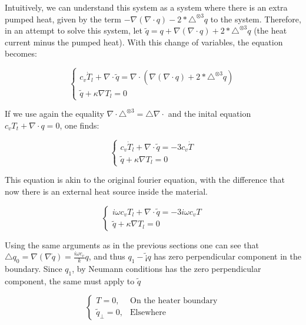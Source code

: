 \documentclass[a4paper, 11pt]{article}
\begin{document}
Intuitively, we can understand this system as a system where there is an extra pumped heat, given by the term $-\nabla(\nabla \cdot q) - 2*\triangle^{\otimes 3} q$ to the system. Therefore, in an attempt to solve this system, let $\tilde q =q + \nabla(\nabla \cdot q) + 2*\triangle^{\otimes 3} q$ (the heat current minus the pumped heat). With this change of variables, the equation becomes:


\begin{equation}
	\label{eq:hydrodinamic_pde_derivative_tilde}
	\begin{cases}
		{c_v \dot T_l + \nabla \cdot \tilde q = \nabla \cdot(\nabla(\nabla \cdot q) + 2*\triangle^{\otimes 3} q) } \\
		{\tilde q +\kappa \nabla T_l  = 0}
	\end{cases}
\end{equation}

If we use again the equality $\nabla \cdot \triangle^{\otimes 3} = \triangle \nabla \cdot {}$ and the inital equation ${c_v T_t + \nabla \cdot q =0}$, one finds:

\begin{equation}
	\label{eq:hydrodinamic_pde_derivative_tilde_2}
	\begin{cases}
		{c_v \dot T_l + \nabla \cdot \tilde q = -3 c_v \dot T} \\
		{\tilde q +\kappa \nabla T_l  = 0}
	\end{cases}
\end{equation}

This equation is akin to the original fourier equation, with the difference that now there is an external heat source inside the material.


\begin{equation}
	\label{eq:hydrodinamic_pde_derivative_tilde_2}
	\begin{cases}
		{ i \omega c_v  T_l + \nabla \cdot \tilde q = -3 i \omega c_v  T} \\
		{\tilde q +\kappa \nabla T_l  = 0}
	\end{cases}
\end{equation}

Using the same arguments as in the previous sections one can see that $\triangle q_0 = \nabla(\nabla\dot q) = \frac{i \omega c_v}{k} q$, and thus $q_1-\tilde ¡q$ has zero perpendicular component in the boundary. Since $q_1$, by Neumann conditions has the zero perpendicular component, the same must apply to $\tilde q$

\begin{equation}
	\begin{cases}
		T = 0, & \text{On the heater boundary}\\
		\tilde q_\bot = 0 , & \text{Elsewhere}                     
	\end{cases}
\end{equation}
\end{document}
